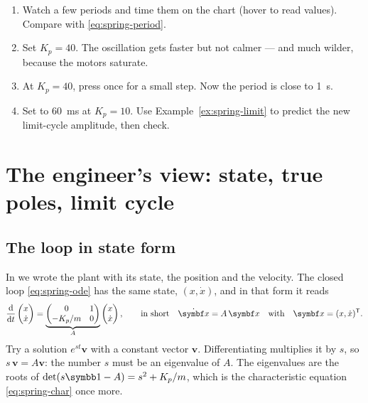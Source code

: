 \begin{trythis}
\begin{enumerate}
  \item Watch a few periods and time them on the chart (hover to read values). Compare with \cref{eq:spring-period}.
  \item Set $K_p = 40$. The oscillation gets faster but not calmer — and much wilder, because the motors saturate.
  \item At $K_p = 40$, press  once for a small step. Now the period is close to \SI{1}{s}.
  \item Set  to \SI{60}{ms} at $K_p = 10$. Use Example~\ref{ex:spring-limit} to predict the new limit-cycle amplitude, then check.
\end{enumerate}
\end{trythis}

\section{The engineer's view: state, true poles, limit cycle}

\subsection{The loop in state form}
In  we wrote the plant with its state, the position and the velocity. The closed loop \eqref{eq:spring-ode} has the same state, $(x, \dot x)$, and in that form it reads
\begin{equation}\label{eq:spring-state}
  \frac{\dd}{\dd t}\begin{pmatrix} x \\ \dot x \end{pmatrix}
  = \underbrace{\begin{pmatrix} 0 & 1 \\ -K_p/m & 0 \end{pmatrix}}_{A}\begin{pmatrix} x \\ \dot x \end{pmatrix},
  \qquad\text{in short}\quad \dot{\vx} = A\,\vx \quad\text{with}\quad \vx = (x, \dot x)^\T .
\end{equation}
Try a solution $e^{st}\symbf v$ with a constant vector $\symbf v$. Differentiating multiplies it by $s$, so $s\,\symbf v = A\symbf v$: the number $s$ must be an eigenvalue of $A$. The eigenvalues are the roots of $\det(s\Id - A) = s^2 + K_p/m$, which is the characteristic equation \eqref{eq:spring-char} once more.

